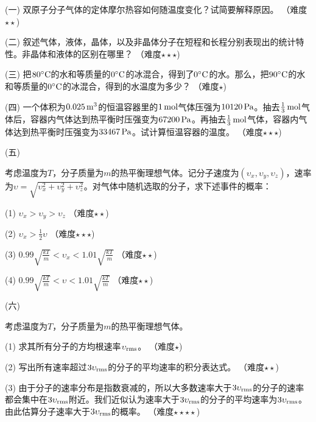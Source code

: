 \documentclass[12pt,CJK]{article}
\begin{document}
\bch




\bitem


\item[(一)]{双原子分子气体的定体摩尔热容如何随温度变化？试简要解释原因。  （难度$\star\star$)}

\item[(二)]{叙述气体，液体，晶体，以及非晶体分子在短程和长程分别表现出的统计特性。非晶体和液体的区别在哪里？ （难度$\star\star\star$)}

\item[(三)]{把$80^\circ \mathrm{C}$的水和等质量的$0^\circ \mathrm{C}$的冰混合，得到了$0^\circ \mathrm{C}$的水。那么，把$90^\circ \mathrm{C}$的水和等质量的$0^\circ \mathrm{C}$的冰混合，得到的水温度为多少？  （难度$\star$)}

\item[(四)]{一个体积为$0.025\,\mathrm{m}^3$的恒温容器里的$1\,\mathrm{mol}$气体压强为$10120 \,\mathrm{Pa}$。抽去$\frac{1}{3}\,\mathrm{mol}$气体后，容器内气体达到热平衡时压强变为$67200\,\mathrm{Pa}$。再抽去$\frac{1}{3}\,\mathrm{mol}$气体，容器内气体达到热平衡时压强变为$33467\,\mathrm{Pa}$。试计算恒温容器的温度。  （难度$\star\star\star$)
}

\item[(五)]{ 考虑温度为$T$，分子质量为$m$的热平衡理想气体。记分子速度为$(\upsilon_x, \upsilon_y, \upsilon_z)$，速率为$\upsilon = \sqrt{\upsilon_x^2+\upsilon_y^2+\upsilon_z^2}$。对气体中随机选取的分子，求下述事件的概率：
    \bitem
	\item[(1)] { $\upsilon_x > \upsilon_y>\upsilon_z $  （难度$\star\star$)}
	\item[(2)] { $\upsilon_x > \frac{1}{2} \upsilon $  （难度$\star\star\star$)}
	\item[(3)] { $ 0.99\sqrt{\frac{kT}{m}}<\upsilon_x < 1.01 \sqrt{\frac{kT}{m}} $  （难度$\star\star$)}
	\item[(4)] { $ 0.99\sqrt{\frac{kT}{m}}<\upsilon < 1.01 \sqrt{\frac{kT}{m}} $  （难度$\star\star$)}
    \eitem
}

\item[(六)]{ 考虑温度为$T$，分子质量为$m$的热平衡理想气体。
    \bitem
	\item[(1)] {求其所有分子的方均根速率$\upsilon_{\rm rms}$。  （难度$\star$)}
	\item[(2)] {写出所有速率超过$3\upsilon_{\rm rms}$的分子的平均速率的积分表达式。  （难度$\star\star$)}
	\item[(3)] {由于分子的速率分布是指数衰减的，所以大多数速率大于$3\upsilon_{\rm rms}$的分子的速率都会集中在$3\upsilon_{\rm rms}$附近。我们近似认为速率大于$3\upsilon_{\rm rms}$的分子的平均速率为$3\upsilon_{\rm rms}$。由此估算分子速率大于$3\upsilon_{\rm rms}$的概率。  （难度$\star\star\star\star$)}
    \eitem
}
\end{document}
